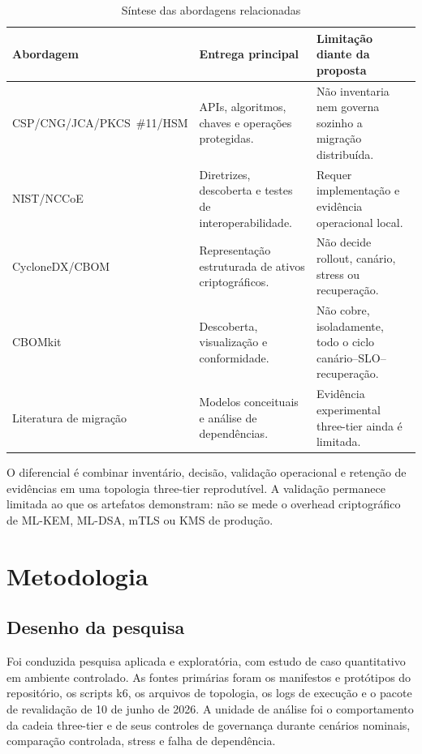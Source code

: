 \documentclass[12pt]{article}
\begin{document}
\begin{table}[ht]
\centering
\caption{S\'intese das abordagens relacionadas}
\label{tab:related-pt}
\scriptsize
\begin{tabularx}{\textwidth}{p{}p{}Y}
\toprule
\textbf{Abordagem} & \textbf{Entrega principal} & \textbf{Limita\c{c}\~ao diante da proposta} \\
\midrule
CSP/CNG/JCA/\newline PKCS~\#11/HSM & APIs, algoritmos, chaves e opera\c{c}\~oes protegidas. & N\~ao inventaria nem governa sozinho a migra\c{c}\~ao distribu\'ida. \\
NIST/NCCoE & Diretrizes, descoberta e testes de interoperabilidade. & Requer implementa\c{c}\~ao e evid\^encia operacional local. \\
CycloneDX/CBOM & Representa\c{c}\~ao estruturada de ativos criptogr\'aficos. & N\~ao decide rollout, can\'ario, stress ou recupera\c{c}\~ao. \\
CBOMkit & Descoberta, visualiza\c{c}\~ao e conformidade. & N\~ao cobre, isoladamente, todo o ciclo can\'ario--SLO--recupera\c{c}\~ao. \\
Literatura de migra\c{c}\~ao & Modelos conceituais e an\'alise de depend\^encias. & Evid\^encia experimental three-tier ainda \'e limitada. \\
\bottomrule
\end{tabularx}
\end{table}

O diferencial \'e combinar invent\'ario, decis\~ao, valida\c{c}\~ao operacional e reten\c{c}\~ao de evid\^encias em uma topologia three-tier reprodut\'ivel. A valida\c{c}\~ao permanece limitada ao que os artefatos demonstram: n\~ao se mede o overhead criptogr\'afico de ML-KEM, ML-DSA, mTLS ou KMS de produ\c{c}\~ao.

\section{Metodologia}
\subsection{Desenho da pesquisa}
Foi conduzida pesquisa aplicada e explorat\'oria, com estudo de caso quantitativo em ambiente controlado. As fontes prim\'arias foram os manifestos e prot\'otipos do reposit\'orio, os scripts k6, os arquivos de topologia, os logs de execu\c{c}\~ao e o pacote de revalida\c{c}\~ao de 10 de junho de 2026. A unidade de an\'alise foi o comportamento da cadeia three-tier e de seus controles de governan\c{c}a durante cen\'arios nominais, compara\c{c}\~ao controlada, stress e falha de depend\^encia.
\end{document}

